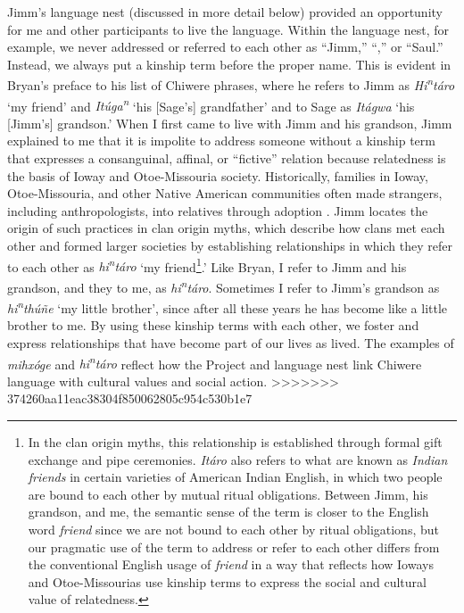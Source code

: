 \documentclass[output=paper]{LSP/langsci}
\begin{document}
Jimm's language nest (discussed in more detail below) provided an opportunity for me and other participants to live the language. Within the language nest, for example, we never addressed or referred to each other as ``Jimm,'' ``,'' or ``Saul.'' Instead, we always put a kinship term before the proper name. This is evident in Bryan's preface to his list of Chiwere phrases, where he refers to Jimm as \emph{Hi\textsuperscript{n}t\'aro} `my friend' and \emph{It\'uga\textsuperscript{n}} `his [Sage's] grandfather' and to Sage as \emph{It\'agwa} `his [Jimm's] grandson.' When I first came to live with Jimm and his grandson, Jimm explained to me that it is impolite to address someone without a kinship term that expresses a consanguinal, affinal, or ``fictive'' relation because relatedness is the basis of Ioway and Otoe-Missouria society. Historically, families in Ioway, Otoe-Missouria, and other Native American communities often made strangers, including anthropologists, into relatives through adoption \citep[see e.g.][]{Kan2001}. Jimm locates the origin of such practices in clan origin myths, which describe how clans met each other and formed larger societies by establishing relationships in which they refer to each other as \emph{hi\textsuperscript{n}t\'aro} `my friend\footnote{In the clan origin myths, this relationship is established through formal gift exchange and pipe ceremonies. \emph{It\'aro} also refers to what are known as \emph{Indian friends} in certain varieties of American Indian English, in which two people are bound to each other by mutual ritual obligations. Between Jimm, his grandson, and me, the semantic sense of the term is closer to the English word \emph{friend} since we are not bound to each other by ritual obligations, but our pragmatic use of the term to address or refer to each other differs from the conventional English usage of \emph{friend} in a way that reflects how Ioways and Otoe-Missourias use kinship terms to express the social and cultural value of relatedness.}.' Like Bryan, I refer to Jimm and his grandson, and they to me, as \emph{hi\textsuperscript{n}t\'aro}. Sometimes I refer to Jimm's grandson as \emph{hi\textsuperscript{n}th\'u\~ne} `my little brother', since after all these years he has become like a little brother to me. By using these kinship terms with each other, we foster and express relationships that have become part of our lives as lived. The examples of \emph{mihx\'oge} and \emph{hi\textsuperscript{n}t\'aro} reflect how the Project and language nest link Chiwere language with cultural values and social action.
>>>>>>> 374260aa11eac38304f850062805c954c530b1e7
\end{document}
